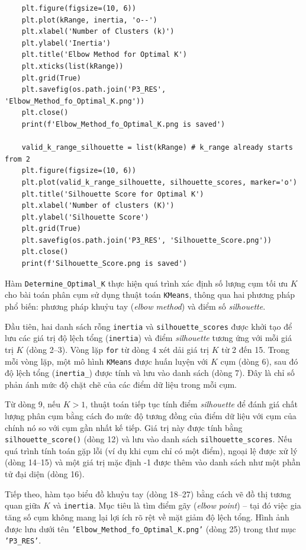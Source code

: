 \documentclass[12pt]{report}
\begin{document}
{\begin{lstlisting}
    plt.figure(figsize=(10, 6))
    plt.plot(kRange, inertia, 'o--')
    plt.xlabel('Number of Clusters (k)')
    plt.ylabel('Inertia')
    plt.title('Elbow Method for Optimal K')
    plt.xticks(list(kRange))
    plt.grid(True)
    plt.savefig(os.path.join('P3_RES', 'Elbow_Method_fo_Optimal_K.png'))
    plt.close()
    print(f'Elbow_Method_fo_Optimal_K.png is saved')

    valid_k_range_silhouette = list(kRange) # k_range already starts from 2
    plt.figure(figsize=(10, 6))
    plt.plot(valid_k_range_silhouette, silhouette_scores, marker='o')
    plt.title('Silhouette Score for Optimal K')
    plt.xlabel('Number of clusters (K)')
    plt.ylabel('Silhouette Score')
    plt.grid(True)
    plt.savefig(os.path.join('P3_RES', 'Silhouette_Score.png'))
    plt.close()
    print(f'Silhouette_Score.png is saved')
\end{lstlisting}
Hàm \texttt{Determine\_Optimal\_K} thực hiện quá trình xác định số lượng cụm tối ưu $K$ cho bài toán phân cụm sử dụng thuật toán \texttt{KMeans}, thông qua hai phương pháp phổ biến: phương pháp khuỷu tay (\textit{elbow method}) và điểm số \textit{silhouette}.

Đầu tiên, hai danh sách rỗng \texttt{inertia} và \texttt{silhouette\_scores} được khởi tạo để lưu các giá trị độ lệch tổng (\texttt{inertia}) và điểm \textit{silhouette} tương ứng với mỗi giá trị $K$ (dòng 2–3). Vòng lặp \texttt{for} từ dòng 4 xét dải giá trị $K$ từ 2 đến 15. Trong mỗi vòng lặp, một mô hình \texttt{KMeans} được huấn luyện với $K$ cụm (dòng 6), sau đó độ lệch tổng (\texttt{inertia\_}) được tính và lưu vào danh sách (dòng 7). Đây là chỉ số phản ánh mức độ chặt chẽ của các điểm dữ liệu trong mỗi cụm.

Từ dòng 9, nếu $K > 1$, thuật toán tiếp tục tính điểm \textit{silhouette} để đánh giá chất lượng phân cụm bằng cách đo mức độ tương đồng của điểm dữ liệu với cụm của chính nó so với cụm gần nhất kế tiếp. Giá trị này được tính bằng \texttt{silhouette\_score()} (dòng 12) và lưu vào danh sách \texttt{silhouette\_scores}. Nếu quá trình tính toán gặp lỗi (ví dụ khi cụm chỉ có một điểm), ngoại lệ được xử lý (dòng 14–15) và một giá trị mặc định -1 được thêm vào danh sách như một phần tử đại diện (dòng 16).

Tiếp theo, hàm tạo biểu đồ khuỷu tay (dòng 18–27) bằng cách vẽ đồ thị tương quan giữa $K$ và \texttt{inertia}. Mục tiêu là tìm điểm gãy (\textit{elbow point}) – tại đó việc gia tăng số cụm không mang lại lợi ích rõ rệt về mặt giảm độ lệch tổng. Hình ảnh được lưu dưới tên \texttt{'Elbow\_Method\_fo\_Optimal\_K.png'} (dòng 25) trong thư mục \texttt{'P3\_RES'}.

}
\end{document}

